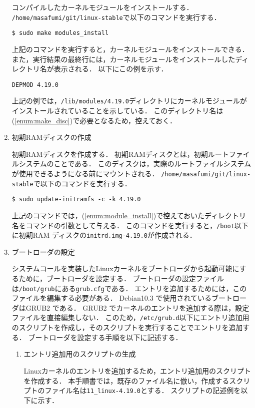 \documentclass[12pt]{jsarticle}
\begin{document}
\begin{enumerate}
  コンパイルしたカーネルモジュールをインストールする．\\
  \verb|/home/masafumi/git/linux-stable|で以下のコマンドを実行する．
\begin{verbatim}
$ sudo make modules_install
\end{verbatim}
上記のコマンドを実行すると，カーネルモジュールをインストールできる．
また，実行結果の最終行には，カーネルモジュールをインストールしたディレクトリ名が表示される．
以下にこの例を示す．
\begin{verbatim}
DEPMOD 4.19.0
\end{verbatim}
上記の例では，\verb|/lib/modules/4.19.0|ディレクトリにカーネルモジュールがインストールされていることを示している．
このディレクトリ名は(\ref{enum:make_disc})で必要となるため，控えておく．

\item\label{enum:make_disc} 初期RAMディスクの作成

  初期RAMディスクを作成する．
  初期RAMディスクとは，初期ルートファイルシステムのことである．
  このディスクは，実際のルートファイルシステムが使用できるようになる前にマウントされる．
  \verb|/home/masafumi/git/linux-stable|で以下のコマンドを実行する．
\begin{verbatim}
$ sudo update-initramfs -c -k 4.19.0
\end{verbatim}
上記のコマンドでは，(\ref{enum:module_install})で控えておいたディレクトリ名をコマンドの引数として与える．
このコマンドを実行すると，\verb|/boot|以下に初期RAM ディスクの\verb|initrd.img-4.19.0|が作成される．

\item\label{enum:bootloader} ブートローダの設定

  システムコールを実装したLinuxカーネルをブートローダから起動可能にするために，ブートローダを設定する．
  ブートローダの設定ファイルは\verb|/boot/grub|にある\verb|grub.cfg|である．
  エントリを追加するためには，このファイルを編集する必要がある．
  Debian10.3 で使用されているブートローダはGRUB2 である．
  GRUB2 でカーネルのエントリを追加する際は，設定ファイルを直接編集しない．
  このため，\verb|/etc/grub.d|以下にエントリ追加用のスクリプトを作成し，そのスクリプトを実行することでエントリを追加する．
  ブートローダを設定する手順を以下に記述する．

  \begin{enumerate}
  \item エントリ追加用のスクリプトの生成

    Linuxカーネルのエントリを追加するため，エントリ追加用のスクリプトを作成する．
    本手順書では，既存のファイル名に倣い，作成するスクリプトのファイル名は\verb|11_linux-4.19.0|とする．
    スクリプトの記述例を以下に示す．


\end{enumerate}
\end{enumerate}
\end{document}
